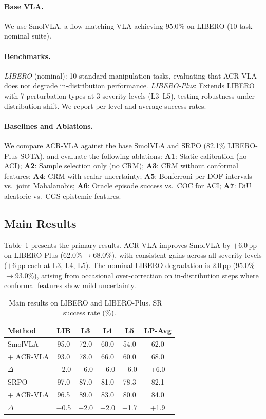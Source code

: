 \documentclass[10pt,twocolumn]{article}
\begin{document}
\paragraph{Base VLA.} We use SmolVLA, a flow-matching VLA achieving 95.0\% on LIBERO (10-task nominal suite).

\paragraph{Benchmarks.}
\emph{LIBERO} (nominal): 10 standard manipulation tasks, evaluating that ACR-VLA does not degrade in-distribution performance.
\emph{LIBERO-Plus}: Extends LIBERO with 7 perturbation types at 3 severity levels (L3--L5), testing robustness under distribution shift. We report per-level and average success rates.

\paragraph{Baselines and Ablations.}
We compare ACR-VLA against the base SmolVLA and SRPO (82.1\% LIBERO-Plus SOTA), and evaluate the following ablations:
\textbf{A1}: Static calibration (no ACI);
\textbf{A2}: Sample selection only (no CRM);
\textbf{A3}: CRM without conformal features;
\textbf{A4}: CRM with scalar uncertainty;
\textbf{A5}: Bonferroni per-DOF intervals vs.\ joint Mahalanobis;
\textbf{A6}: Oracle episode success vs.\ COC for ACI;
\textbf{A7}: DiU aleatoric vs.\ CGS epistemic features.

\subsection{Main Results}

Table~\ref{tab:main} presents the primary results.
ACR-VLA improves SmolVLA by $+6.0$\,pp on LIBERO-Plus (62.0\%$\to$68.0\%), with consistent gains across all severity levels ($+6$\,pp each at L3, L4, L5).
The nominal LIBERO degradation is 2.0\,pp (95.0\%$\to$93.0\%), arising from occasional over-correction on in-distribution steps where conformal features show mild uncertainty.

\begin{table}[t]
\centering
\small
\caption{Main results on LIBERO and LIBERO-Plus. SR = success rate (\%).}
\label{tab:main}
\begin{tabular}{@{}lccccc@{}}
\toprule
Method & LIB & L3 & L4 & L5 & LP-Avg \\
\midrule
SmolVLA & 95.0 & 72.0 & 60.0 & 54.0 & 62.0 \\
\;+ ACR-VLA & 93.0 & 78.0 & 66.0 & 60.0 & 68.0 \\
\;$\Delta$ & $-$2.0 & +6.0 & +6.0 & +6.0 & +6.0 \\
\midrule
SRPO & 97.0 & 87.0 & 81.0 & 78.3 & 82.1 \\
\;+ ACR-VLA & 96.5 & 89.0 & 83.0 & 80.0 & 84.0 \\
\;$\Delta$ & $-$0.5 & +2.0 & +2.0 & +1.7 & +1.9 \\
\bottomrule
\end{tabular}
\end{table}
\end{document}

